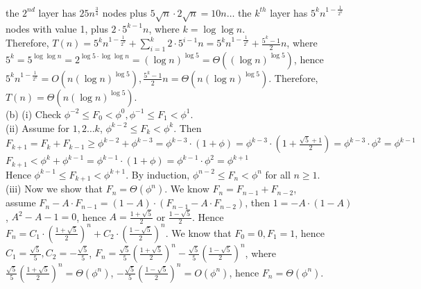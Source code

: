\documentclass[11pt,twoside]{article}
\newenvironment{solution}{{\par\noindent\it Solution.}}{}
\begin{document}
\begin{solution}
the $2^{nd}$ layer has $25n^{\frac{3}{4}}$ nodes plus $5\sqrt{n}\cdot 2\sqrt{n}=10n\dots$
the $k^{th}$ layer has $5^kn^{1-\frac{1}{2^k}}$ nodes with value 1, plus $2\cdot 5^{k-1} n$,
where $k=\log{\log{n}}$. \\
Therefore, $T(n)=5^kn^{1-\frac{1}{2^k}}+\sum_{i=1}^k{2\cdot 5^{i-1}n}=5^kn^{1-\frac{1}{2^k}}+\frac{5^k-1}{2}n$,
where $5^k=5^{\log{\log{n}}}=2^{\log{5}\cdot\log\log{n}}=(\log{n})^{\log{5}}=\Theta\left((\log{n})^{\log{5}}\right)$, hence $5^kn^{1-\frac{1}{2^k}}=O(n(\log{n})^{\log{5}}), \frac{5^k-1}{2}n=\Theta(n(\log{n})^{\log{5}})$.
Therefore, $T(n)=\Theta(n(\log{n})^{\log{5}})$. 
\vspace{0.45cm}\\
(b) (i) Check $\phi^{-2}\leq F_0 < \phi^0, \phi^{-1}\leq F_1 < \phi^1$.
\vspace{0.25cm}\\
(ii) Assume for $1, 2 \dots k$, $\phi^{k-2}\leq F_k < \phi^k$.
Then $F_{k+1}=F_k+F_{k-1}\geq \phi^{k-2}+\phi^{k-3}=\phi^{k-3} \cdot (1 + \phi)
=\phi^{k-3} \cdot (1 + \frac{\sqrt{5}+1}{2})=\phi^{k-3} \cdot \phi^2=\phi^{k-1}$\\
$F_{k+1} < \phi^{k}+\phi^{k-1}=\phi^{k-1} \cdot (1+\phi)=\phi^{k-1}\cdot \phi^{2}=\phi^{k+1}$\\
Hence $\phi^{k-1}\leq F_{k+1} < \phi^{k+1}$. By induction, $\phi^{n-2}\leq F_n < \phi^{n}$ for all $n\geq 1$.
\vspace{0.25cm}\\
(iii) Now we show that $F_n=\Theta(\phi^n)$. We know $F_n=F_{n-1}+F_{n-2}$, \\
assume $F_n-A\cdot F_{n-1}=(1-A)\cdot(F_{n-1}-A\cdot F_{n-2})$, then $1=-A\cdot (1-A)$, $A^2-A-1=0$, hence $A=\frac{1+\sqrt{5}}{2}$ or $\frac{1-\sqrt{5}}{2}$.        
Hence $F_n=C_1\cdot (\frac{1+\sqrt{5}}{2})^n+C_2\cdot (\frac{1-\sqrt{5}}{2})^n$. We know that $F_0=0, F_1=1$, hence $C_1=\frac{\sqrt{5}}{5}, C_2=-\frac{\sqrt{5}}{5}$,                   
$F_n=\frac{\sqrt{5}}{5}(\frac{1+\sqrt{5}}{2})^n-\frac{\sqrt{5}}{5}(\frac{1-\sqrt{5}}{2})^n$, where $\frac{\sqrt{5}}{5}(\frac{1+\sqrt{5}}{2})^n=\Theta(\phi^n)$,
$-\frac{\sqrt{5}}{5}(\frac{1-\sqrt{5}}{2})^n=O(\phi^n)$, hence $F_n=\Theta(\phi^n)$.
\end{solution}
\end{document}
